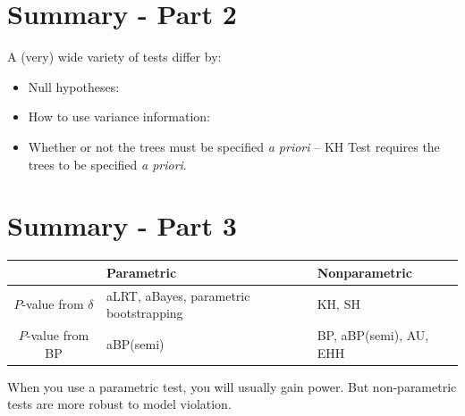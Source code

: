 \section*{Summary - Part 2}
\normalsize
A (very) wide variety of tests differ by:
\begin{itemize}
    \item Null hypotheses:
    \item How to use variance information:
    \item Whether or not the trees must be specified {\em a priori} -- KH Test requires the trees to be specified {\em a priori}.
\end{itemize}

\myNewSlide
\section*{Summary - Part 3}
\large
\begin{table}[htdp]
\begin{center}
\begin{tabular}{|c|p{7cm}|p{6cm}|}
\hline
& Parametric & Nonparametric \\
\hline
$P$-value from $\delta$  & aLRT, aBayes, parametric bootstrapping & KH, SH \\
\hline
$P$-value from BP  &aBP(semi)  & BP, aBP(semi), AU, EHH\\
\hline
\end{tabular}
\end{center}
\label{default}
\end{table}%

When you use a parametric test, you will usually gain power. But non-parametric tests are more robust to model violation.


